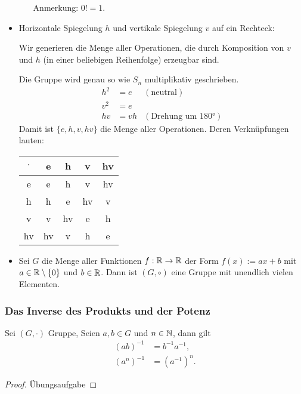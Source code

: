 \begin{bsp}
\begin{itemize}
\begin{itemize}
		Anmerkung: $ 0! = 1 $. 
	\end{itemize}
	
	\item Horizontale Spiegelung $ h $ und vertikale Spiegelung $ v $ auf ein Rechteck:
	
	Wir generieren die Menge aller Operationen, die durch Komposition von $ v $ und $ h $ (in einer beliebigen Reihenfolge) erzeugbar sind.
	
	Die Gruppe wird genau so wie $ S_n $ multiplikativ geschrieben.
	\begin{align*}
	h^2 &= e &(\text{neutral}) \\
	v^2 &= e \\
	hv &= vh &(\text{Drehung um 180°})
	\end{align*}
	Damit ist $ \{ e,h,v,hv \} $ die Menge aller Operationen. Deren Verknüpfungen lauten:
	
	\begin{center}
	\begin{tabular}{c||c|c|c|c}
		$ \cdot $ & e & h & v & hv \\
		\hline \hline
		e & e & h & v & hv \\
		h & h & e & hv & v \\
		v & v & hv & e & h \\
		hv & hv & v & h & e
	\end{tabular}
	\end{center}
	
	\item Sei $ G $ die Menge aller Funktionen $ f : \mathbb R \to \mathbb R $ der Form $ f(x) := ax + b $ mit $ a \in \mathbb R \setminus \{ 0 \} $ und $ b \in \mathbb R $. Dann ist $ (G,\circ) $ eine Gruppe mit unendlich vielen Elementen.
\end{itemize}
\end{bsp}


\subsubsection{Das Inverse des Produkts und der Potenz}
\begin{propn}
	Sei $ (G, \cdot) $ Gruppe, Seien $ a, b \in G $ und $ n \in \mathbb N $, dann gilt
	\begin{align}
		(ab)^{-1} &= b^{-1} a^{-1},\\
		(a^{n})^{-1} &= (a^{-1})^{n}.
	\end{align}
\end{propn}
\begin{proof}
	Übungsaufgabe
\end{proof}

